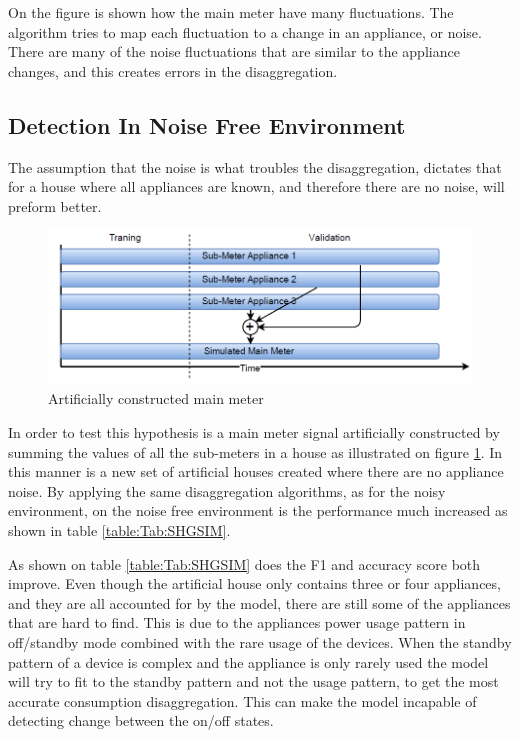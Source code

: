 On the figure is shown how the main meter have many fluctuations. The algorithm tries to map each fluctuation to a change in an appliance, or noise. There are many of the noise fluctuations that are similar to the appliance changes, and this creates errors in the disaggregation. 

\subsection{Detection In Noise Free Environment }
\label{sec:NOISEFREE}
The assumption that the noise is what troubles the disaggregation, dictates that for a house where all appliances are known, and therefore there are no noise, will preform better. 

\begin{figure}[H]
\centering
\includegraphics[width=1\textwidth]{billeder/SimIllu.png}
\caption{Artificially constructed main meter}
\label{fig:SIL}
\end{figure}

In order to test this hypothesis is a main meter signal artificially constructed by summing the values of all the sub-meters in a house as illustrated on figure \ref{fig:SIL}. In this manner is a new set of artificial houses created where there are no appliance noise. By applying the same disaggregation algorithms, as for the noisy environment, on the noise free environment is the performance much increased as shown in table \ref{table:Tab:SHGSIM}.

  

As shown on table \ref{table:Tab:SHGSIM} does the F1 and accuracy score both improve. Even though the artificial house only contains three or four appliances, and they are all accounted for by the model, there are still some of the appliances that are hard to find. This is due to the appliances power usage pattern in off/standby mode combined with the rare usage of the devices. When the standby pattern of a device is complex and the appliance is only rarely used the model will try to fit to the standby pattern and not the usage pattern, to get the most accurate consumption disaggregation. This can make the model incapable of detecting change between the on/off states.

